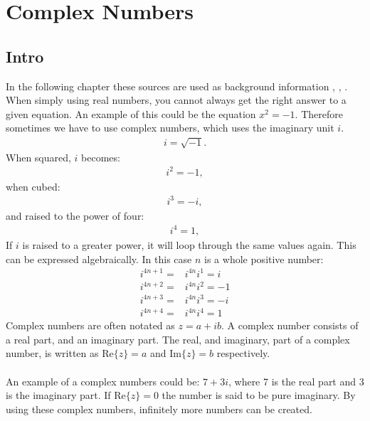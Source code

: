 \chapter{Complex Numbers}

\section{Intro}
In the following chapter these sources are used as background information \cite{complexpaul}, \cite{complexpurple}, \cite{complexnotebook}.
When simply using real numbers, you cannot always get the right answer to a given equation. An example of this could be the equation $x^2=-1$. Therefore sometimes we have to use complex numbers, which uses the imaginary unit $i$.
\begin{align*}
i=\sqrt{-1}.
\end{align*}
When squared, $i$ becomes:
\begin{align*}
i^2=-1,
\end{align*}
when cubed:
\begin{align*}
i^3=-i,
\end{align*}
and raised to the power of four:
\begin{align*}
i^4=1,
\end{align*}
If $i$ is raised to a greater power, it will loop through the same values again. This can be expressed algebraically. In this case $n$ is a whole positive number:
\begin{align*}
	i^{4n+1} =& i^{4n}i^1 = i \\
	i^{4n+2} =& i^{4n}i^2 = -1 \\
	i^{4n+3} =& i^{4n}i^3 = -i \\
	i^{4n+4} =& i^{4n}i^4 = 1
\end{align*}
Complex numbers are often notated as $z = a+ib$. A complex number consists of a real part, and an imaginary part. The real, and imaginary, part of a complex number, is written as $\text{Re}\{z\}=a$ and $\text{Im}\{z\}=b$ respectively.
\\
\\
An example of a complex numbers could be: $7+3i$, where 7 is the real part and 3 is the imaginary part. If $\text{Re}\{z\}=0$ the number is said to be pure imaginary. 
By using these complex numbers, infinitely more numbers can be created. 
